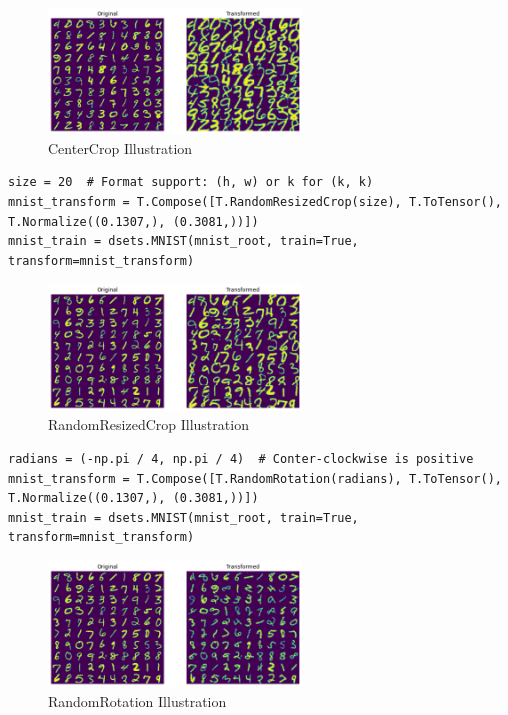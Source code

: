 \documentclass[a4paper, 11pt]{article} %
\begin{document}
\begin{figure}[H]
    \centering
    \includegraphics[width=0.6\textwidth]{./img/centercrop.png}
    \caption{CenterCrop Illustration}
\end{figure}

\begin{lstlisting}
size = 20  # Format support: (h, w) or k for (k, k)
mnist_transform = T.Compose([T.RandomResizedCrop(size), T.ToTensor(), T.Normalize((0.1307,), (0.3081,))])
mnist_train = dsets.MNIST(mnist_root, train=True, transform=mnist_transform)
\end{lstlisting}

\begin{figure}[H]
    \centering
    \includegraphics[width=0.6\textwidth]{./img/randomresize.png}
    \caption{RandomResizedCrop Illustration}
\end{figure}

\begin{lstlisting}
radians = (-np.pi / 4, np.pi / 4)  # Conter-clockwise is positive
mnist_transform = T.Compose([T.RandomRotation(radians), T.ToTensor(), T.Normalize((0.1307,), (0.3081,))])
mnist_train = dsets.MNIST(mnist_root, train=True, transform=mnist_transform)
\end{lstlisting}

\begin{figure}[H]
    \centering
    \includegraphics[width=0.6\textwidth]{./img/randomrotate.png}
    \caption{RandomRotation Illustration}
\end{figure}
\end{document}
